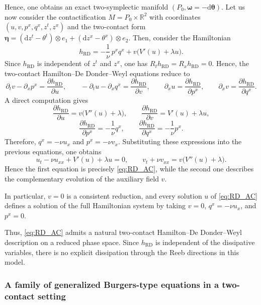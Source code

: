 \documentclass[11pt,a4paper]{article}
\newcommand{\dd}{\mathrm{d}}
\theoremstyle{plain} \newtheorem{theorem}{Theorem}[section] \newtheorem{proposition}[theorem]{Proposition} \newtheorem{corollary}[theorem]{Corollary} \newtheorem{lemma}[theorem]{Lemma} \theoremstyle{definition} \newtheorem{definition}[theorem]{Definition} \theoremstyle{remark} \newtheorem{remark}[theorem]{Remark} \newtheorem{example}[theorem]{Example} %
\begin{document}
Hence, one obtains an exact two-symplectic manifold $(P_0,\bm\omega=-\dd\bm\theta)$. %
 Let us now consider the contactification \(M=P_0\times\mathbb R^2\) with coordinates \((u,v,p^x,q^x,z^t,z^x)\) and the two-contact form \({\bm \eta}=(\dd z^t-\theta^t)\otimes e_1+(\dd z^x-\theta^x)\otimes e_2.\) Then, consider  the Hamiltonian
\[
h_{\mathrm{RD}}=-\frac1{\nu}\,p^xq^x+v\bigl(V'(u)+\lambda u\bigr).
\]
Since \(h_{\mathrm{RD}}\) is independent of \(z^t\) and \(z^x\), one has \( {R_t}h_{\mathrm{RD}}= {R_x}h_{\mathrm{RD}}=0\). Hence, the two-contact Hamilton--De Donder--Weyl equations reduce to
\[
\partial_t v-\partial_x p^x=\frac{\partial h_{\mathrm{RD}}}{\partial u},\qquad
-\partial_t u-\partial_x q^x=\frac{\partial h_{\mathrm{RD}}}{\partial v},\qquad
\partial_x u=\frac{\partial h_{\mathrm{RD}}}{\partial p^x},\qquad
\partial_x v=\frac{\partial h_{\mathrm{RD}}}{\partial q^x}.
\]
A direct computation gives
\[
\frac{\partial h_{\mathrm{RD}}}{\partial u}=v\bigl(V''(u)+\lambda\bigr),\qquad
\frac{\partial h_{\mathrm{RD}}}{\partial v}=V'(u)+\lambda u,
\]
\[
\frac{\partial h_{\mathrm{RD}}}{\partial p^x}=-\frac1{\nu}q^x,\qquad
\frac{\partial h_{\mathrm{RD}}}{\partial q^x}=-\frac1{\nu}p^x.
\]
Therefore, \(q^x=-\nu u_x\) and \(p^x=-\nu v_x\). Substituting these expressions into the previous equations, one obtains
\[
u_t-\nu u_{xx}+V'(u)+\lambda u=0,\qquad
v_t+\nu v_{xx}=v\bigl(V''(u)+\lambda\bigr).
\]
Hence the first equation is precisely \eqref{eq:RD_AC}, while the second one describes the complementary evolution of the auxiliary field \(v\).

In particular, \(v=0\) is a consistent reduction, and every solution \(u\) of \eqref{eq:RD_AC} defines a solution of the full Hamiltonian system by taking \(v=0\), \(q^x=-\nu u_x\), and \(p^x=0\).

Thus, \eqref{eq:RD_AC} admits a natural two-contact Hamilton--De Donder--Weyl description on a reduced phase space. Since \(h_{\mathrm{RD}}\) is independent of the dissipative variables, there is no explicit dissipation through the Reeb directions in this model.  
\subsubsection{A family of generalized Burgers-type equations in a two-contact setting}
\end{document}
